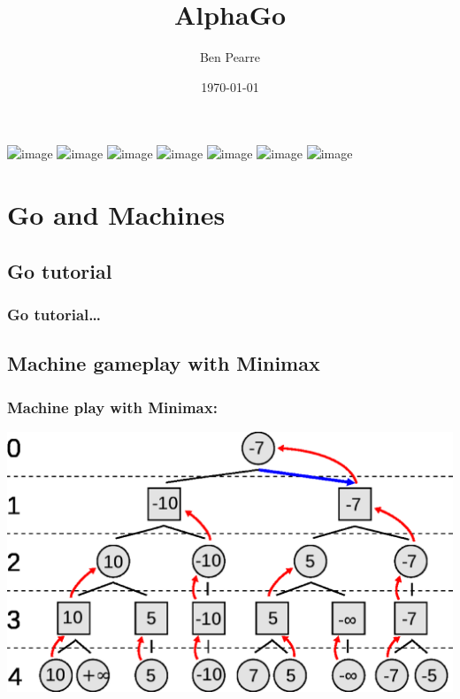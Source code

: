 \documentclass{beamer}
\title[AlphaGo]{AlphaGo}
\author{Ben Pearre}
\date{\today}
\begin{document}


\begin{frame}[plain]
  \begin{center}
    \includegraphics<+>[width=\textwidth]{knot}
    \includegraphics<+>[width=\textwidth]{knot_closeup}
    \includegraphics<+>[width=\textwidth]{darwin}
    \includegraphics<+>[width=\textwidth]{Go-players}
    \includegraphics<+>[width=\textwidth]{ZhongguoMeishuQuanji}
    \includegraphics<+>[width=\textwidth]{Wenwu_1189}
    \includegraphics<+>[width=\textwidth]{Sedol-Alphago}
  \end{center}
\end{frame}



\section{Go and Machines}

\subsection{Go tutorial}

\begin{frame}
  \frametitle{Go tutorial\dots}
  \begin{center}
    \href{http://playgo.to/index-e.html}{}
  \end{center}
\end{frame}

\subsection{Machine gameplay with Minimax}

\begin{frame}
  \frametitle{Machine play with Minimax:}
  \begin{center}
    \includegraphics[width=\textwidth]{minimax}
  \end{center}
\end{frame}
\end{document}
